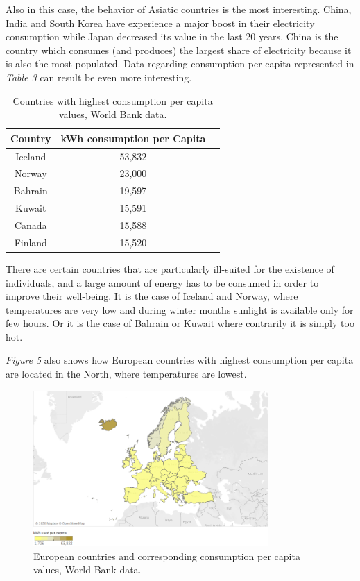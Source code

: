 \documentclass{book}
\begin{document}
Also in this case, the behavior of Asiatic countries is the most interesting. China, India and South Korea have experience a major boost in their electricity consumption while Japan decreased its value in the last 20 years. China is the country which consumes (and produces) the largest share of electricity because it is also the most populated. Data regarding consumption per capita represented in \textit{Table 3} can result be even more interesting.

\bigskip
\begin{table}[H]
\begin{center}
\begin{tabular}{|c|c|c|}
\hline
Country & kWh consumption per Capita\\
\hline
Iceland & 53,832\\
Norway & 23,000\\
Bahrain & 19,597\\
Kuwait & 15,591\\
Canada & 15,588\\
Finland & 15,520\\
\hline
\end{tabular}
\caption{Countries with highest consumption per capita values, World Bank data.}
\end{center}
\end{table}

There are certain countries that are particularly ill-suited for the existence of individuals, and a large amount of energy has to be consumed in order to improve their well-being. It is the case of Iceland and Norway, where temperatures are very low and during winter months sunlight is available only for few hours. Or it is the case of Bahrain or Kuwait where contrarily it is simply too hot.

\textit{Figure 5} also shows how European countries with highest consumption per capita are located in the North, where temperatures are lowest.

\bigskip
\begin{figure}[H]
\begin{center}
\captionsetup{justification=centering}
\includegraphics[width=0.8\textwidth]{Images/cons.png}
\caption{European countries and corresponding consumption per capita values, World Bank data. }
\end{center}
\end{figure}
\bigskip
\end{document}
